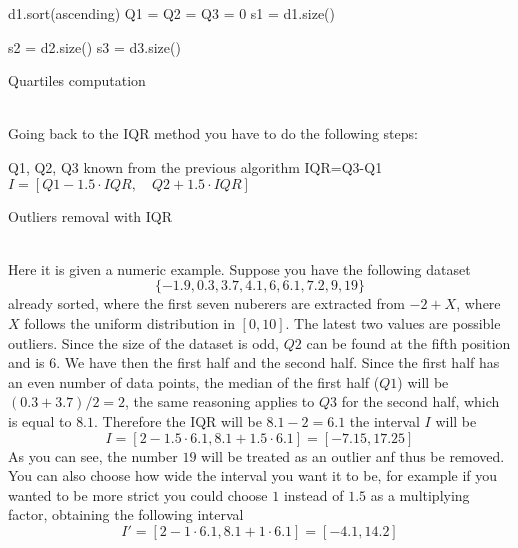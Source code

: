 \documentclass[12pt,twoside]{report}
\begin{document}
\begin{algorithm}[H]
\SetAlgoLined
{}
d1.sort(ascending)\;
Q1 = Q2 = Q3 = 0\;
s1 = d1.size()\;

s2 = d2.size()\;
s3 = d3.size()\;
 \caption{Quartiles computation}
\end{algorithm}
\noindent \\Going back to the IQR method you have to do the following steps:

\begin{algorithm}[H]
\SetAlgoLined
{}
Q1, Q2, Q3 known from the previous algorithm\;
IQR=Q3-Q1\;
$I=[Q1-1.5\cdot IQR,\quad Q2 + 1.5\cdot IQR]$\;
 \caption{Outliers removal with IQR}
\end{algorithm}
\noindent \\Here it is given a numeric example. Suppose you have the following dataset $$\{-1.9, 0.3, 3.7, 4.1, 6, 6.1, 7.2, 9, 19\}$$ already sorted, where the first seven nuberers are extracted from $-2+X$, where $X$ follows the uniform distribution in $[0,10]$. The latest two values are possible outliers. Since the size of the dataset is odd, $Q2$ can be found at the fifth position and is $6$. We have then the first half and the second half. Since the first half has an even number of data points, the median of the first half ($Q1$) will be $(0.3+3.7)/2=2$, the same reasoning applies to $Q3$ for the second half, which is equal to $8.1$. Therefore the IQR will be $8.1-2=6.1$ the interval $I$ will be
$$I=[2-1.5\cdot6.1,8.1+1.5\cdot6.1]=[-7.15,17.25]$$
As you can see, the number $19$ will be treated as an outlier anf thus be removed. You can also choose how wide the interval you want it to be, for example if you wanted to be more strict you could choose $1$ instead of $1.5$ as a multiplying factor, obtaining the following interval
$$I'=[2-1\cdot6.1,8.1+1\cdot6.1]=[-4.1,14.2]$$
\end{document}
